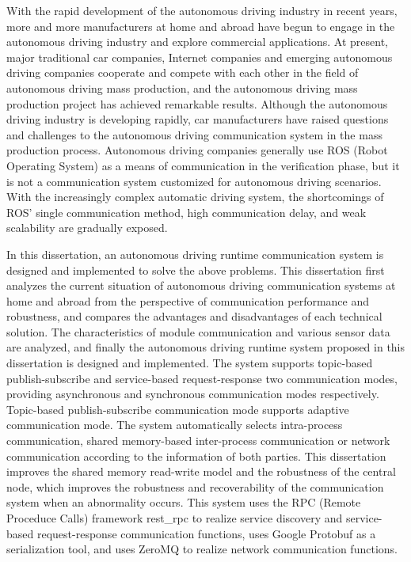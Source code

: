 \begin{abstract*}
  With the rapid development of the autonomous driving industry in recent years, 
  more and more manufacturers at home and abroad have begun to engage in the autonomous driving industry and explore commercial applications. 
  At present, major traditional car companies, 
  Internet companies and emerging autonomous driving companies cooperate and compete with each other in the field of autonomous driving mass production, 
  and the autonomous driving mass production project has achieved remarkable results. 
  Although the autonomous driving industry is developing rapidly, 
  car manufacturers have raised questions and challenges to the autonomous driving communication system in the mass production process. 
  Autonomous driving companies generally use ROS (Robot Operating System) as a means of communication in the verification phase, 
  but it is not a communication system customized for autonomous driving scenarios. 
  With the increasingly complex automatic driving system, 
  the shortcomings of ROS' single communication method, 
  high communication delay, and weak scalability are gradually exposed. 

  In this dissertation, an autonomous driving runtime communication system is designed and implemented to solve the above problems.
  This dissertation first analyzes the current situation of autonomous driving communication systems at home and abroad from the perspective of communication performance and robustness, and compares the advantages and disadvantages of each technical solution.
  The characteristics of module communication and various sensor data are analyzed, and finally the autonomous driving runtime system proposed in this dissertation is designed and implemented.
  The system supports topic-based publish-subscribe and service-based request-response two communication modes, providing asynchronous and synchronous communication modes respectively.
  Topic-based publish-subscribe communication mode supports adaptive communication mode.
  The system automatically selects intra-process communication, shared memory-based inter-process communication or network communication according to the information of both parties.
  This dissertation improves the shared memory read-write model and the robustness of the central node, which improves the robustness and recoverability of the communication system when an abnormality occurs.
  This system uses the RPC (Remote Proceduce Calls) framework rest\_rpc to realize service discovery and service-based request-response communication functions, uses Google Protobuf as a serialization tool, and uses ZeroMQ to realize network communication functions.


\end{abstract*}
